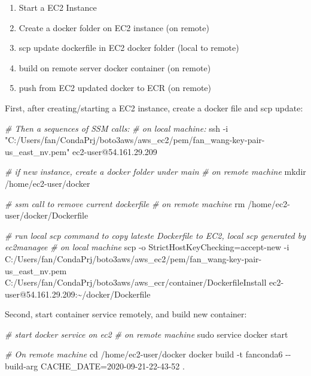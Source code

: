 \documentclass[
]{book}
\newenvironment{Shaded}{\begin{snugshade}}{\end{snugshade}}
\newcommand{\BuiltInTok}[1]{#1}
\newcommand{\CommentTok}[1]{\textcolor[rgb]{0.56,0.35,0.01}{\textit{#1}}}
\newcommand{\ExtensionTok}[1]{#1}
\newcommand{\FunctionTok}[1]{\textcolor[rgb]{0.00,0.00,0.00}{#1}}
\newcommand{\NormalTok}[1]{#1}
\newcommand{\StringTok}[1]{\textcolor[rgb]{0.31,0.60,0.02}{#1}}
\providecommand{\tightlist}{%
  \setlength{\itemsep}{0pt}\setlength{\parskip}{0pt}}
\begin{document}
\begin{enumerate}
\def\labelenumi{\arabic{enumi}.}
\tightlist
\item
  Start a EC2 Instance
\item
  Create a docker folder on EC2 instance (on remote)
\item
  scp update dockerfile in EC2 docker folder (local to remote)
\item
  build on remote server docker container (on remote)
\item
  push from EC2 updated docker to ECR (on remote)
\end{enumerate}

First, after creating/starting a EC2 instance, create a docker file and scp update:

\begin{Shaded}
\begin{Highlighting}[]
\CommentTok{\# Then a sequences of SSM calls:}
\CommentTok{\# on local machine:}
\FunctionTok{ssh}\NormalTok{ {-}i }\StringTok{"C:/Users/fan/CondaPrj/boto3aws/aws\_ec2/pem/fan\_wang{-}key{-}pair{-}us\_east\_nv.pem"}\NormalTok{ ec2{-}user@54.161.29.209}

\CommentTok{\# if new instance, create a docker folder under main}
\CommentTok{\# on remote machine}
\FunctionTok{mkdir}\NormalTok{ /home/ec2{-}user/docker}

\CommentTok{\# ssm call to remove current dockerfile}
\CommentTok{\# on remote machine}
\FunctionTok{rm}\NormalTok{ /home/ec2{-}user/docker/Dockerfile}

\CommentTok{\# run local scp command to copy lateste Dockerfile to EC2, local scp generated by ec2managee}
\CommentTok{\# on local machine}
\FunctionTok{scp}\NormalTok{ {-}o StrictHostKeyChecking=accept{-}new {-}i C:/Users/fan/CondaPrj/boto3aws/aws\_ec2/pem/fan\_wang{-}key{-}pair{-}us\_east\_nv.pem C:/Users/fan/CondaPrj/boto3aws/aws\_ecr/container/DockerfileInstall ec2{-}user@54.161.29.209:\textasciitilde{}/docker/Dockerfile}
\end{Highlighting}
\end{Shaded}

Second, start container service remotely, and build new container:

\begin{Shaded}
\begin{Highlighting}[]
\CommentTok{\# start docker service on ec2}
\CommentTok{\# on remote machine}
\FunctionTok{sudo}\NormalTok{ service docker start}

\CommentTok{\# On remote machine}
\BuiltInTok{cd}\NormalTok{ /home/ec2{-}user/docker}
\ExtensionTok{docker}\NormalTok{ build {-}t fanconda6 {-}{-}build{-}arg CACHE\_DATE=2020{-}09{-}21{-}22{-}43{-}52 .}
\end{Highlighting}
\end{Shaded}
\end{document}
